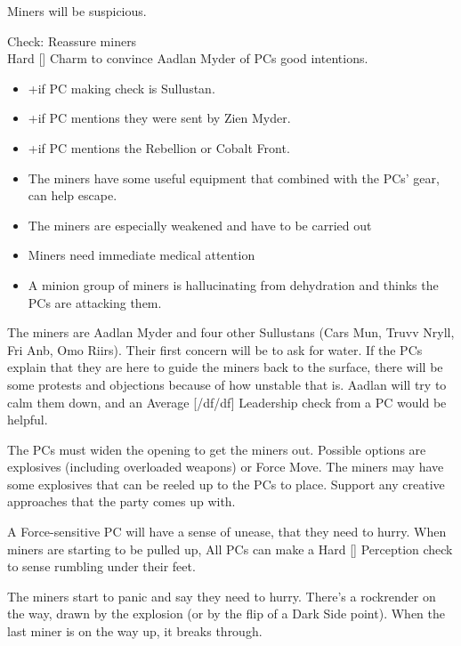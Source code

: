 \documentclass{book}
\newcommand{\df}{\difficulty}
\newcommand{\stb}{\setback}
\begin{document}
\begin{multicols}{2}
Miners will be suspicious.
\begin{quote}
\end{quote}

Check: Reassure miners\\
Hard [\challenge\df\df\stb\stb] Charm to convince Aadlan Myder of PCs good intentions. 
\begin{itemize}
	\item +\boost if PC making check is Sullustan.
	\item  +\boost if PC mentions they were sent by Zien Myder.
	\item  +\boost if PC mentions the Rebellion or Cobalt Front.
\end{itemize}
\begin{itemize}
	\item \advantage The miners have some useful equipment that combined with the PCs' gear, can help escape.
	\item \threat The miners are especially weakened and have to be carried out
	\item \threat\threat Miners need immediate medical attention
	\item \despair A minion group of miners is hallucinating from dehydration and thinks the PCs are attacking them.
\end{itemize}


The miners are Aadlan Myder and four other Sullustans (Cars Mun, Truvv Nryll, Fri Anb, Omo Riirs). Their first concern will be to ask for water. If the PCs explain that they are here to guide the miners back to the surface, there will be some protests and objections because of how unstable that is. Aadlan will try to calm them down, and an Average [/df/df] Leadership check from a PC would be helpful.

The PCs must widen the opening to get the miners out. Possible options are explosives (including overloaded weapons) or Force Move. The miners may have some explosives that can be reeled up to the PCs to place. Support any creative approaches that the party comes up with.

A Force-sensitive PC will have a sense of unease, that they need to hurry. When miners are starting to be pulled up, All PCs can make a Hard [\df\df\df] Perception check to sense rumbling under their feet.

The miners start to panic and say they need to hurry. There’s a rockrender on the way, drawn by the explosion (or by the flip of a Dark Side point). When the last miner is on the way up, it breaks through.


\end{multicols}
\end{document}
